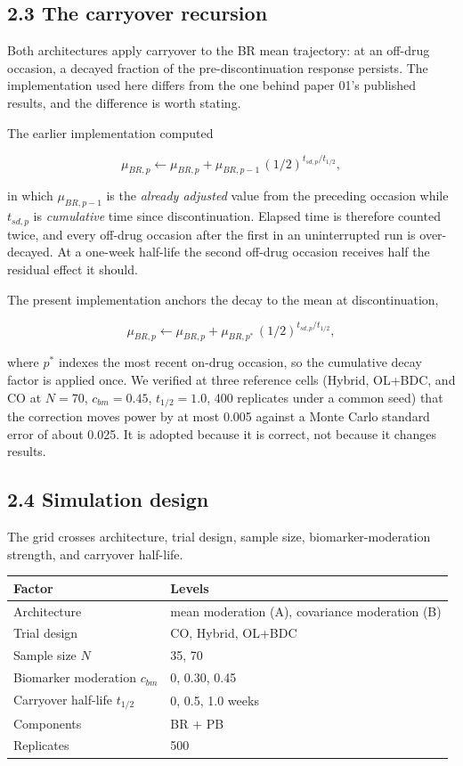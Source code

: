 \documentclass[
  11pt,
]{article}
\newcounter{none} %
\begin{document}
\subsection{2.3 The carryover recursion}

Both architectures apply carryover to the BR mean trajectory: at an
off-drug occasion, a decayed fraction of the pre-discontinuation
response persists. The implementation used here differs from the one
behind paper 01's published results, and the difference is worth
stating.

The earlier implementation computed

\[
\mu_{BR,p} \leftarrow \mu_{BR,p} + \mu_{BR,p-1}\,
  (1/2)^{t_{sd,p}/t_{1/2}},
\]

in which \(\mu_{BR,p-1}\) is the \emph{already adjusted} value from the
preceding occasion while \(t_{sd,p}\) is \emph{cumulative} time since
discontinuation. Elapsed time is therefore counted twice, and every
off-drug occasion after the first in an uninterrupted run is
over-decayed. At a one-week half-life the second off-drug occasion
receives half the residual effect it should.

The present implementation anchors the decay to the mean at
discontinuation,

\[
\mu_{BR,p} \leftarrow \mu_{BR,p} + \mu_{BR,p^{\ast}}\,
  (1/2)^{t_{sd,p}/t_{1/2}},
\]

where \(p^{\ast}\) indexes the most recent on-drug occasion, so the
cumulative decay factor is applied once. We verified at three
reference cells (Hybrid, OL+BDC, and CO at \(N = 70\), \(c_{bm} = 0.45\),
\(t_{1/2} = 1.0\), 400 replicates under a common seed) that the
correction moves power by at most 0.005 against a Monte Carlo
standard error of about 0.025. It is adopted because it is correct,
not because it changes results.

\subsection{2.4 Simulation design}

The grid crosses architecture, trial design, sample size,
biomarker-moderation strength, and carryover half-life.

{\def\LTcaptype{none} %
\begin{longtable}[]{@{}ll@{}}
\toprule\noalign{}
Factor & Levels \\
\midrule\noalign{}
\endhead
\bottomrule\noalign{}
\endlastfoot
Architecture & mean moderation (A), covariance moderation (B) \\
Trial design & CO, Hybrid, OL+BDC \\
Sample size \(N\) & 35, 70 \\
Biomarker moderation \(c_{bm}\) & 0, 0.30, 0.45 \\
Carryover half-life \(t_{1/2}\) & 0, 0.5, 1.0 weeks \\
Components & BR + PB \\
Replicates & 500 \\
\end{longtable}
}
\end{document}
